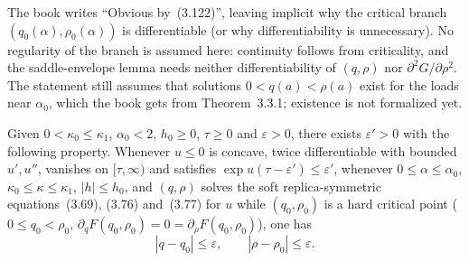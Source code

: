 \begin{remark}\label{rem:sg-tal:st-lemma-336}
The book writes ``Obvious by~(3.122)'', leaving implicit why the critical branch $(q_0(\alpha),\rho_0(\alpha))$ is
differentiable (or why differentiability is unnecessary). No regularity of the branch is assumed here:
continuity follows from criticality, and the saddle-envelope lemma needs neither differentiability of
$(q,\rho)$ nor $\partial^2G/\partial\rho^2$. The statement still assumes that solutions
$0<q(a)<\rho(a)$ exist for the loads near $\alpha_0$, which the book gets from Theorem~3.3.1; existence is
not formalized yet.
\end{remark}

\begin{corollary}\label{cor:sg-tal:st-soft-hard-stability}
  \leanok
Given $0<\kappa_0\le\kappa_1$, $\alpha_0<2$, $h_0\ge0$, $\tau\ge0$ and $\varepsilon>0$, there exists
$\varepsilon'>0$ with the following property. Whenever $u\le0$ is concave, twice differentiable with
bounded $u',u''$, vanishes on $[\tau,\infty)$ and satisfies $\exp u(\tau-\varepsilon')\le\varepsilon'$,
whenever $0\le\alpha\le\alpha_0$, $\kappa_0\le\kappa\le\kappa_1$, $|h|\le h_0$, and $(q,\rho)$ solves the
soft replica-symmetric equations~(3.69), (3.76) and~(3.77) for $u$ while $(q_0,\rho_0)$ is a hard critical
point ($0\le q_0<\rho_0$, $\partial_q F(q_0,\rho_0)=0=\partial_\rho F(q_0,\rho_0)$), one has
\[
|q-q_0|\le\varepsilon,\qquad |\rho-\rho_0|\le\varepsilon.
\]
\end{corollary}
